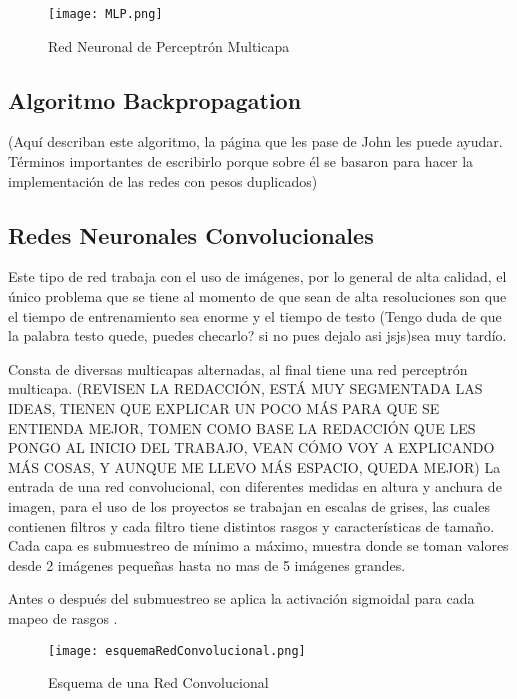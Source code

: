             \begin{figure}[H]
                \centering
                \texttt{[image: MLP.png]}
                \caption{Red Neuronal de Perceptr\'on Multicapa \cite{liu2015}}
                \label{fig:fig1}
            \end{figure}


\subsection{Algoritmo Backpropagation}
(Aquí describan este algoritmo, la página que les pase de John les puede ayudar. Términos importantes de escribirlo porque sobre él se basaron para hacer la implementación de las redes con pesos duplicados)


        \subsection{Redes Neuronales Convolucionales}

            Este tipo de red trabaja con el uso de imágenes, por lo general de alta calidad, el \'unico problema que se tiene 
            al momento de que sean de alta resoluciones son que el tiempo de entrenamiento sea enorme y el tiempo de testo (Tengo duda de que la palabra testo quede, puedes checarlo? si no pues dejalo asi jsjs)sea muy tardío.

            Consta de diversas multicapas alternadas, al final tiene una red perceptr\'on multicapa. (REVISEN LA REDACCIÓN, ESTÁ MUY SEGMENTADA LAS IDEAS, TIENEN QUE EXPLICAR UN POCO MÁS PARA QUE SE ENTIENDA MEJOR, TOMEN COMO BASE LA REDACCIÓN QUE LES PONGO AL INICIO DEL TRABAJO, VEAN CÓMO VOY A EXPLICANDO MÁS COSAS, Y AUNQUE ME LLEVO MÁS ESPACIO, QUEDA MEJOR)
            La entrada de una red convolucional, con diferentes medidas en altura y anchura de imagen, para el uso 
            de los proyectos se trabajan en escalas de grises, las cuales contienen filtros y cada filtro tiene distintos 
            rasgos y características de tamaño. Cada capa es submuestreo de m\'inimo a m\'aximo, muestra donde se toman valores 
            desde 2 im\'agenes pequeñas hasta no mas de 5 im\'agenes grandes.

            Antes o despu\'es del submuestreo se aplica la activaci\'on sigmoidal para cada mapeo de rasgos \cite{duran2017}.

            \begin{figure}[H]
                \centering
                \texttt{[image: esquemaRedConvolucional.png]}
                \caption{Esquema de una Red Convolucional \cite{duran2017}}
                \label{fig:fig2}
            \end{figure}

